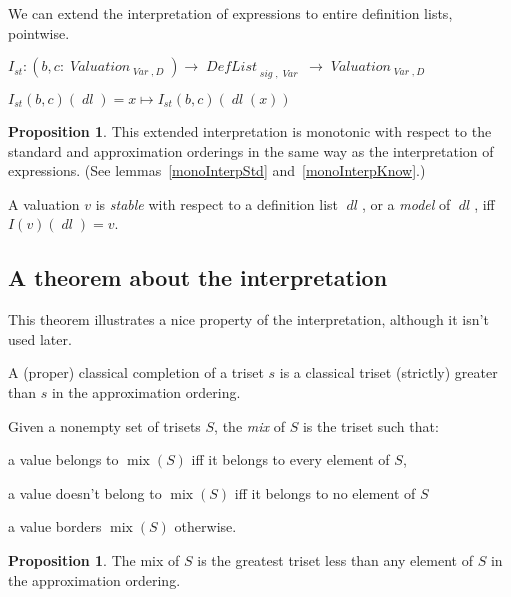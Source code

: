 \documentclass[oneside,12pt]{book}
\theoremstyle{definition}
\newtheorem{proposition}[theorem]{Proposition}
\theoremstyle{remark}
\newcommand\var[1]{\mathop{\mathit{#1}}\nolimits}
\newcommand{\sig}{\var{sig}}
\newcommand{\st}{\var{st}}
\newcommand{\Var}{\var{Var}}
\newcommand{\Valuation}{\var{Valuation}}
\newcommand{\DefList}{\var{DefList}}
\newcommand{\dl}{\var{dl}}
\DeclareMathOperator{\mix}{mix}
\begin{document}
We can extend the interpretation of expressions to entire definition lists,
pointwise.

\begin{defBox}
  $I_{\st}\colon (b,c\colon \Valuation_{\Var,D}) \to \DefList_{\sig,\Var}
    \to \Valuation_{\Var,D}$
  
  \medskip \noindent
  $I_{\st}(b, c)(\dl) = x \mapsto I_{\st}(b, c)(\dl(x))$
\end{defBox}

\begin{proposition} \label{extendedInterpretationBoring}
  This extended interpretation is monotonic with respect to the standard and
  approximation orderings in the same way as the interpretation of expressions.
  (See lemmas~\ref{monoInterpStd} and~\ref{monoInterpKnow}.)
\end{proposition}

\begin{defBox}
  A valuation $v$ is \textit{stable} with respect to a definition list $\dl$,
  or a \textit{model} of $\dl$, iff $I(v)(\dl) = v$.
\end{defBox}

\subsection{A theorem about the interpretation}
This theorem illustrates a nice property of the interpretation, although it
isn't used later. %

\begin{defBox}
  A (proper) classical completion of a triset $s$ is a classical triset
  (strictly) greater than $s$ in the approximation ordering.
  
  \medskip \noindent Given a nonempty set of trisets $S$, the \textit{mix} of $S$
  is the triset such that:
  \begin{compactitem}
    \item a value belongs to $\mix(S)$ iff it belongs to every element of $S$,
    \item a value doesn't belong to $\mix(S)$ iff it belongs to no element of $S$
    \item a value borders $\mix(S)$ otherwise.
  \end{compactitem}
\end{defBox}

\begin{proposition}
  The mix of $S$ is the greatest triset less than any element of $S$ in the
  approximation ordering.
\end{proposition}
\end{document}
